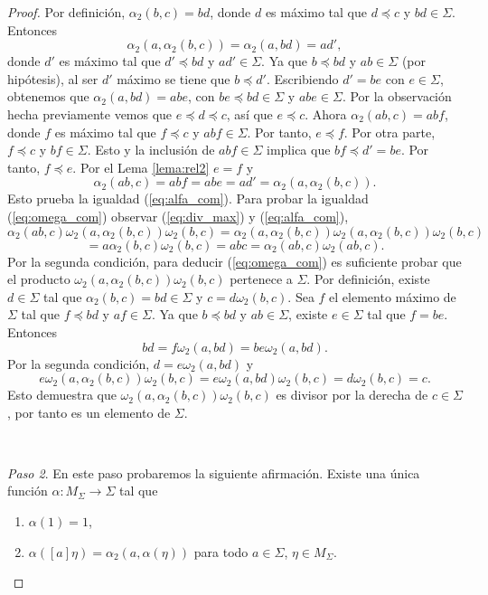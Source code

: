 \documentclass[12pt]{book}
\theoremstyle{definition}
\begin{document}
\begin{proof}
Por definición, $\alpha_2(b,c)=bd$, donde $d$ es máximo tal que $d\preceq c$ y $bd\in \Sigma$. Entonces
$$\alpha_2(a,\alpha_2(b,c))=\alpha_2(a,bd)=ad',$$
donde $d'$ es máximo tal que $d'\preceq bd$ y $ad'\in\Sigma$. Ya que $b\preceq bd$ y $ab\in\Sigma$ (por hipótesis), al ser $d'$ máximo se tiene que $b\preceq d'$. Escribiendo $d'=be$ con $e\in\Sigma$, obtenemos que $\alpha_2(a,bd)=abe$, con $be\preceq bd\in\Sigma$ y $abe\in\Sigma$. Por la observación hecha previamente vemos que $e\preceq d\preceq c$, así que $e\preceq c$. Ahora $\alpha_2(ab,c)=abf$, donde $f$ es máximo tal que $f\preceq c$ y $abf\in\Sigma$. Por tanto, $e\preceq f$. Por otra parte, $f\preceq c$ y $bf\in\Sigma$. Esto y la inclusión de $abf\in\Sigma$ implica que $bf\preceq d' = be$. Por tanto, $f\preceq e$. Por el Lema \ref{lema:rel2} $e=f$ y
$$\alpha_2(ab,c)=abf=abe=ad'=\alpha_2(a,\alpha_2(b,c)).$$
Esto prueba la igualdad (\ref{eq:alfa_com}). Para probar la igualdad (\ref{eq:omega_com}) observar (\ref{eq:div_max}) y (\ref{eq:alfa_com}),
$$\alpha_2(ab,c)\omega_2(a,\alpha_2(b,c))\omega_2(b,c)=\alpha_2(a,\alpha_2(b,c))\omega_2(a,\alpha_2(b,c))\omega_2(b,c)$$
$$=a\alpha_2(b,c)\omega_2(b,c)=abc=\alpha_2(ab,c)\omega_2(ab,c).$$
Por la segunda condición, para deducir (\ref{eq:omega_com}) es suficiente probar que el producto $\omega_2(a,\alpha_2(b,c))\omega_2(b,c)$ pertenece a $\Sigma$. Por definición, existe $d\in\Sigma$ tal que $\alpha_2(b,c)=bd\in\Sigma$ y $c=d\omega_2(b,c)$. Sea $f$ el elemento máximo de $\Sigma$ tal que $f\preceq bd$ y $af\in\Sigma$. Ya que $b\preceq bd$ y $ab\in\Sigma$, existe $e\in\Sigma$ tal que $f=be$. Entonces
$$bd=f\omega_2(a,bd)=be\omega_2(a,bd).$$
Por la segunda condición, $d=e\omega_2(a,bd)$ y
$$e\omega_2(a,\alpha_2(b,c))\omega_2(b,c)=e\omega_2(a,bd)\omega_2(b,c)=d\omega_2(b,c)=c.$$
Esto demuestra que $\omega_2(a,\alpha_2(b,c))\omega_2(b,c)$ es divisor por la derecha de $c\in\Sigma$, por tanto es un elemento de $\Sigma$.

\ 
 
\textit{Paso 2}. En este paso probaremos la siguiente afirmación. Existe una única función $\alpha:M_\Sigma\rightarrow\Sigma$ tal que

\begin{enumerate}[label=\roman*.]
\item $\alpha(1)=1$,
\item $\alpha([a]\eta)=\alpha_2(a,\alpha(\eta))$ para todo $a\in\Sigma$, $\eta\in M_\Sigma$.
\end{enumerate}


\end{proof}
\end{document}
